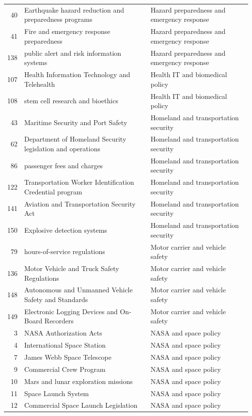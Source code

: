 \begin{longtable}{rll}
40 & Earthquake hazard reduction and preparedness programs & Hazard preparedness and emergency response \\
41 & Fire and emergency response preparedness & Hazard preparedness and emergency response \\
138 & public alert and risk information systems & Hazard preparedness and emergency response \\
107 & Health Information Technology and Telehealth & Health IT and biomedical policy \\
108 & stem cell research and bioethics & Health IT and biomedical policy \\
43 & Maritime Security and Port Safety & Homeland and transportation security \\
62 & Department of Homeland Security legislation and operations & Homeland and transportation security \\
86 & passenger fees and charges & Homeland and transportation security \\
122 & Transportation Worker Identification Credential program & Homeland and transportation security \\
141 & Aviation and Transportation Security Act & Homeland and transportation security \\
150 & Explosive detection systems & Homeland and transportation security \\
79 & hours-of-service regulations & Motor carrier and vehicle safety \\
136 & Motor Vehicle and Truck Safety Regulations & Motor carrier and vehicle safety \\
148 & Autonomous and Unmanned Vehicle Safety and Standards & Motor carrier and vehicle safety \\
149 & Electronic Logging Devices and On-Board Recorders & Motor carrier and vehicle safety \\
3 & NASA Authorization Acts & NASA and space policy \\
4 & International Space Station & NASA and space policy \\
7 & James Webb Space Telescope & NASA and space policy \\
9 & Commercial Crew Program & NASA and space policy \\
10 & Mars and lunar exploration missions & NASA and space policy \\
11 & Space Launch System & NASA and space policy \\
12 & Commercial Space Launch Legislation & NASA and space policy \\

\end{longtable}
